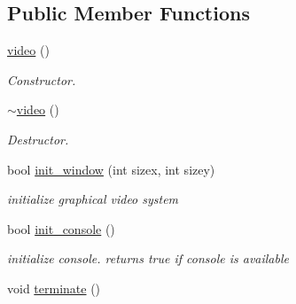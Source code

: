 \subsection*{Public Member Functions}
\begin{DoxyCompactItemize}
\item 
\hypertarget{classvideo_a6cae9b4ab405e8c97f868c9526c30311}{}\hyperlink{classvideo_a6cae9b4ab405e8c97f868c9526c30311}{video} ()\label{classvideo_a6cae9b4ab405e8c97f868c9526c30311}

\begin{DoxyCompactList}\small\item\em Constructor. \end{DoxyCompactList}\item 
\hypertarget{classvideo_a608d56a8dda3f7c4018cd3688acfb34f}{}\hyperlink{classvideo_a608d56a8dda3f7c4018cd3688acfb34f}{$\sim$video} ()\label{classvideo_a608d56a8dda3f7c4018cd3688acfb34f}

\begin{DoxyCompactList}\small\item\em Destructor. \end{DoxyCompactList}\item 
bool \hyperlink{classvideo_a1d7ed9754a9fb22fb94600cf4e538caa}{init\+\_\+window} (int sizex, int sizey)
\begin{DoxyCompactList}\small\item\em initialize graphical video system \end{DoxyCompactList}\item 
\hypertarget{classvideo_adf4c9da52e37d92fec1e34bbe3f6afbd}{}bool \hyperlink{classvideo_adf4c9da52e37d92fec1e34bbe3f6afbd}{init\+\_\+console} ()\label{classvideo_adf4c9da52e37d92fec1e34bbe3f6afbd}

\begin{DoxyCompactList}\small\item\em initialize console. returns true if console is available \end{DoxyCompactList}\item 
\hypertarget{classvideo_a49fe2b2eefd1118d871120ec787d355a}{}void \hyperlink{classvideo_a49fe2b2eefd1118d871120ec787d355a}{terminate} ()\label{classvideo_a49fe2b2eefd1118d871120ec787d355a}


\end{DoxyCompactItemize}

